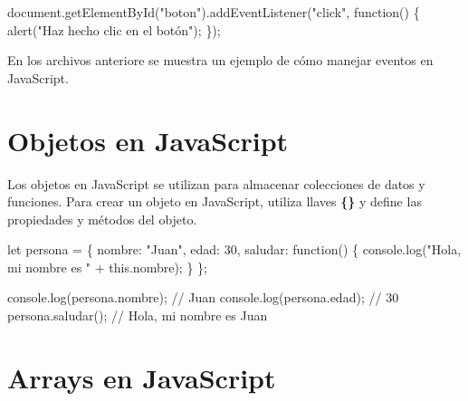 \documentclass[
  a4paper,
  DIV=11,
  numbers=noendperiod,
  onepage,
  openany]{scrreprt}
\newenvironment{Shaded}{\begin{snugshade}}{\end{snugshade}}
\newcommand{\AttributeTok}[1]{\textcolor[rgb]{0.40,0.45,0.13}{#1}}
\newcommand{\BuiltInTok}[1]{\textcolor[rgb]{0.00,0.23,0.31}{#1}}
\newcommand{\CommentTok}[1]{\textcolor[rgb]{0.37,0.37,0.37}{#1}}
\newcommand{\DataTypeTok}[1]{\textcolor[rgb]{0.68,0.00,0.00}{#1}}
\newcommand{\DecValTok}[1]{\textcolor[rgb]{0.68,0.00,0.00}{#1}}
\newcommand{\FunctionTok}[1]{\textcolor[rgb]{0.28,0.35,0.67}{#1}}
\newcommand{\KeywordTok}[1]{\textcolor[rgb]{0.00,0.23,0.31}{#1}}
\newcommand{\NormalTok}[1]{\textcolor[rgb]{0.00,0.23,0.31}{#1}}
\newcommand{\OperatorTok}[1]{\textcolor[rgb]{0.37,0.37,0.37}{#1}}
\newcommand{\StringTok}[1]{\textcolor[rgb]{0.13,0.47,0.30}{#1}}
\begin{document}
\begin{Shaded}
\begin{Highlighting}[]
\BuiltInTok{document}\OperatorTok{.}\FunctionTok{getElementById}\NormalTok{(}\StringTok{"boton"}\NormalTok{)}\OperatorTok{.}\FunctionTok{addEventListener}\NormalTok{(}\StringTok{"click"}\OperatorTok{,} \KeywordTok{function}\NormalTok{() \{}
    \FunctionTok{alert}\NormalTok{(}\StringTok{"Haz hecho clic en el botón"}\NormalTok{)}\OperatorTok{;}
\NormalTok{\})}\OperatorTok{;}
\end{Highlighting}
\end{Shaded}

En los archivos anteriore se muestra un ejemplo de cómo manejar eventos
en JavaScript.

\section{Objetos en JavaScript}\label{objetos-en-javascript}

Los objetos en JavaScript se utilizan para almacenar colecciones de
datos y funciones. Para crear un objeto en JavaScript, utiliza llaves
\textbf{\{\}} y define las propiedades y métodos del objeto.

\begin{Shaded}
\begin{Highlighting}[]
\KeywordTok{let}\NormalTok{ persona }\OperatorTok{=}\NormalTok{ \{}
    \DataTypeTok{nombre}\OperatorTok{:} \StringTok{"Juan"}\OperatorTok{,}
    \DataTypeTok{edad}\OperatorTok{:} \DecValTok{30}\OperatorTok{,}
    \DataTypeTok{saludar}\OperatorTok{:} \KeywordTok{function}\NormalTok{() \{}
        \BuiltInTok{console}\OperatorTok{.}\FunctionTok{log}\NormalTok{(}\StringTok{"Hola, mi nombre es "} \OperatorTok{+} \KeywordTok{this}\OperatorTok{.}\AttributeTok{nombre}\NormalTok{)}\OperatorTok{;}
\NormalTok{    \}}
\NormalTok{\}}\OperatorTok{;}

\BuiltInTok{console}\OperatorTok{.}\FunctionTok{log}\NormalTok{(persona}\OperatorTok{.}\AttributeTok{nombre}\NormalTok{)}\OperatorTok{;} \CommentTok{// Juan}
\BuiltInTok{console}\OperatorTok{.}\FunctionTok{log}\NormalTok{(persona}\OperatorTok{.}\AttributeTok{edad}\NormalTok{)}\OperatorTok{;} \CommentTok{// 30}
\NormalTok{persona}\OperatorTok{.}\FunctionTok{saludar}\NormalTok{()}\OperatorTok{;} \CommentTok{// Hola, mi nombre es Juan}
\end{Highlighting}
\end{Shaded}

\section{Arrays en JavaScript}\label{arrays-en-javascript}
\end{document}
